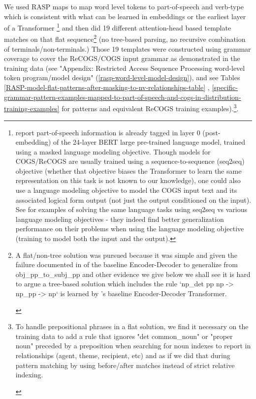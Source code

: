 \documentclass[11pt]{article}
\begin{document}
We used RASP maps to map word level tokens to part-of-speech and verb-type which is consistent with what can be learned in embeddings or the earliest layer of a Transformer \cite{tenney2019bertrediscoversclassicalnlp}\footnote{\cite{tenney2019bertrediscoversclassicalnlp} report part-of-speech information is already tagged in layer 0 (post-embedding) of the 24-layer BERT large pre-trained language model, trained using a masked language modeling objective. Though models for COGS/ReCOGS are usually trained using a sequence-to-sequence (seq2seq) objective (whether that objective biases the Transformer to learn the same representation on this task is not known to our knowledge), one could also use a language modeling objective to model the COGS input text and its associated logical form output (not just the output conditioned on the input). See \cite{10.1162/tacl_a_00733} for examples of solving the same language tasks using seq2seq vs various language modeling objectives - they indeed find better generalization performance on their problems when using the language modeling objective (training to model both the input and the output).} and then did 19 different attention-head based template matches on that flat sequence\footnote{\begin{footnotesize}A flat/non-tree solution was pursued because it was simple and given the failure documented in \cite{Wu2023} of the baseline Encoder-Decoder to generalize from obj\_pp\_to\_subj\_pp and other evidence we give below we shall see it is hard to argue a tree-based solution which includes the rule `np\_det pp np -> np\_pp -> np` is learned by \cite{Wu2023}'s baseline Encoder-Decoder Transformer.\end{footnotesize}} (no tree-based parsing, no recursive combination of terminals/non-terminals.) Those 19 templates were constructed using grammar coverage \cite{fuzzingbook2023:GrammarCoverageFuzzer} to cover the ReCOGS/COGS input grammar as demonstrated in the training data (see "Appendix: Restricted Access Sequence Processing word-level token program/model design" (\ref{rasp-word-level-model-design}), and see Tables \ref{RASP-model-flat-patterns-after-masking-to-nv-relationships-table} , \ref{specific-grammar-pattern-examples-mapped-to-part-of-speech-and-cogs-in-distribution-training-examples} for patterns and equivalent ReCOGS training examples).\footnote{\begin{footnotesize}To handle prepositional phrases in a flat solution, we find it necessary on the training data to add a rule that ignores "det common\_noun" or "proper noun" preceded by a preposition when searching for noun indexes to report in relationships (agent, theme, recipient, etc) and as if we did that during pattern matching by using before/after matches instead of strict relative indexing.\end{footnotesize}}.
\end{document}
